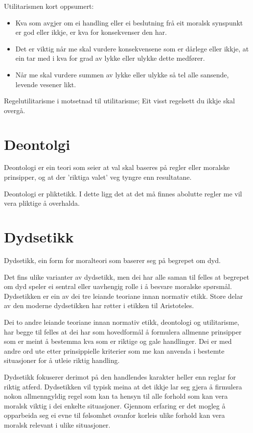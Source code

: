 \documentclass[a4paper]{IEEEtran}
\begin{document}
Utilitarismen kort oppsumert:\bigskip
\begin{itemize}
    \item Kva som avgjer om ei handling eller ei beslutning frå eit moralsk synspunkt er god eller ikkje, er kva for konsekvenser den har.
    \item Det er viktig når me skal vurdere konsekvensene som er dårlege eller ikkje, at ein tar med i kva for grad av lykke eller ulykke dette medfører.
    \item Når me skal vurdere summen av lykke eller ulykke så tel alle sansende, levende vesener likt. 
\end{itemize}\bigskip

Regelutilitarisme i motsetnad til utilitarisme; Eit visst regelsett du ikkje skal overgå.
\bigskip

\bigskip
\section{Deontolgi}
\label{deontologi}

Deontologi er ein teori som seier at val skal baseres på regler eller moralske prinsipper, og at der 'riktiga valet' veg tyngre enn resultatane.

Deontologi er pliktetikk. I dette ligg det at det må finnes abolutte regler me vil vera pliktige å overhalda. 
\section{Dydsetikk}
\label{dydsetikk}\bigskip

Dydsetikk, ein form for moralteori som baserer seg på begrepet om dyd.\newline

Det fins ulike varianter av dydsetikk, men dei har alle saman til felles at begrepet om dyd speler ei sentral eller uavhengig rolle i å besvare moralske spørsmål. Dydsetikken er ein av dei tre leiande teoriane innan normativ etikk. Store delar av den moderne dydsetikken har røtter i etikken til Aristoteles.\bigskip

Dei to andre leiande teoriane innan normativ etikk, deontologi og utilitarisme, har begge til felles at dei har som hovedformål å formulera allmenne prinsipper som er meint å bestemma kva som er riktige og gale handlinger. Dei er med andre ord ute etter prinsippielle kriterier som me kan anvenda i bestemte situasjoner for å utleie riktig handling.\bigskip

Dydsetikk fokuserer derimot på den handlendes karakter heller enn reglar for riktig atferd. Dydsetikken vil typisk meina at det ikkje lar seg gjera å firmulera nokon allmenngyldig regel som kan ta hensyn til alle forhold som kan vera moralsk viktig i dei enkelte situasjoner. Gjennom erfaring er det mogleg å opparbeida seg ei evne til følsomhet ovanfor korleis ulike forhold kan vera moralsk relevant i ulike situasjoner.\bigskip
\end{document}

